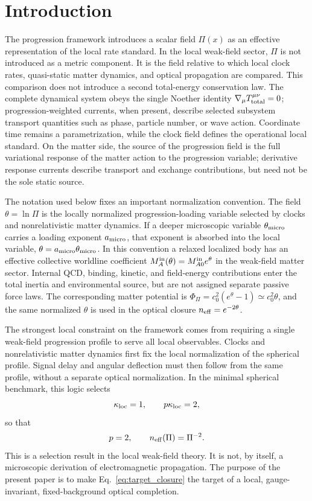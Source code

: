 \documentclass[12pt]{article}
\begin{document}
\section{Introduction}
\label{sec:introduction}

The progression framework introduces a scalar field $\Pi(x)$ as an effective representation of the local rate standard.  In the local weak-field sector, $\Pi$ is not introduced as a metric component.  It is the field relative to which local clock rates, quasi-static matter dynamics, and optical propagation are compared.  This comparison does not introduce a second total-energy conservation law.  The complete dynamical system obeys the single Noether identity $\nabla_\mu T_{\rm total}^{\mu\nu}=0$; progression-weighted currents, when present, describe selected subsystem transport quantities such as phase, particle number, or wave action.  Coordinate time remains a parametrization, while the clock field defines the operational local standard.  On the matter side, the source of the progression field is the full variational response of the matter action to the progression variable; derivative response currents describe transport and exchange contributions, but need not be the sole static source.

The notation used below fixes an important normalization convention.  The field $\theta=\ln\Pi$ is the locally normalized progression-loading variable selected by clocks and nonrelativistic matter dynamics.  If a deeper microscopic variable $\theta_{\rm micro}$ carries a loading exponent $a_{\rm micro}$, that exponent is absorbed into the local variable, $\theta=a_{\rm micro}\theta_{\rm micro}$.  In this convention a relaxed localized body has an effective collective worldline coefficient $M_A^{\rm in}(\theta)=M_{A0}^{\rm in}e^{\theta}$ in the weak-field matter sector.  Internal QCD, binding, kinetic, and field-energy contributions enter the total inertia and environmental source, but are not assigned separate passive force laws.  The corresponding matter potential is $\Phi_\Pi=c_0^2(e^{\theta}-1)\simeq c_0^2\theta$, and the same normalized $\theta$ is used in the optical closure $n_{\rm eff}=e^{-2\theta}$.

The strongest local constraint on the framework comes from requiring a single weak-field progression profile to serve all local observables.  Clocks and nonrelativistic matter dynamics first fix the local normalization of the spherical profile.  Signal delay and angular deflection must then follow from the same profile, without a separate optical normalization.  In the minimal spherical benchmark, this logic selects
\begin{equation}
\kappa_{\rm loc}=1,\qquad p\kappa_{\rm loc}=2,
\label{eq:local_selection}
\end{equation}
so that
\begin{equation}
 p=2,\qquad n_{\rm eff}(\Pi)=\Pi^{-2}.
\label{eq:target_closure}
\end{equation}
This is a selection result in the local weak-field theory.  It is not, by itself, a microscopic derivation of electromagnetic propagation.  The purpose of the present paper is to make Eq.~\eqref{eq:target_closure} the target of a local, gauge-invariant, fixed-background optical completion.
\end{document}

